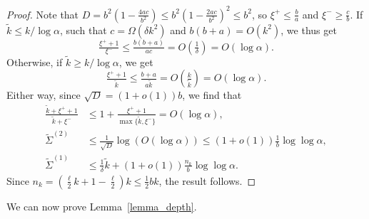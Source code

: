 \documentclass{article}
\theoremstyle{plain}
\theoremstyle{remark}
\theoremstyle{plain}
\numberwithin{equation}{section}
\begin{document}
\begin{proof}
		Note that $D=b^2(1-\tfrac{4ac}{b^2})\leq b^2(1-\tfrac{2ac}{b^2})^2\leq b^2$, so $\xi^+\leq\tfrac{b}{a}$ and $\xi^-\geq\tfrac{c}{b}$. If $\widetilde{k}\leq k/\log\alpha$, such that $c=\Omega(\delta k^2)$ and $b(b+a)=O(k^2)$, we thus get $$\tfrac{\xi^++1}{\xi^-}\leq\tfrac{b(b+a)}{ac}=O(\tfrac{1}{\delta})=O(\log\alpha).$$ Otherwise, if $\widetilde{k}\geq k/\log\alpha$, we get $$\tfrac{\xi^++1}{\tilde{k}}\leq\tfrac{b+a}{a\tilde{k}}=O(\tfrac{k}{\tilde{k}})=O(\log\alpha).$$ Either way, since $\sqrt{D}=(1+o(1))b$, we find that
		\begin{align}
			\frac{\tilde{k}+\xi^++1}{\tilde{k}+\xi^-}
			&\leq1+\frac{\xi^++1}{\max\{\tilde{k},\xi^-\}}=O(\log\alpha),
			\\\widetilde{\Sigma}^{(2)}
			&\leq\tfrac1{\sqrt{D}}\log(O(\log\alpha))\leq(1+o(1))\tfrac1{b}\log\log\alpha,
			\\\widetilde{\Sigma}^{(1)}
			&\leq\tfrac1{\delta}\widetilde{k}+(1+o(1))\tfrac{n_k}{b}\log\log\alpha.
		\end{align}
		Since $n_k=(\tfrac{\ell}{2}k+1-\tfrac{\ell}2)k\leq\tfrac12bk$, the result follows.
	\end{proof}
	
	We can now prove Lemma~\ref{lemma_depth}.
	
\end{document}
